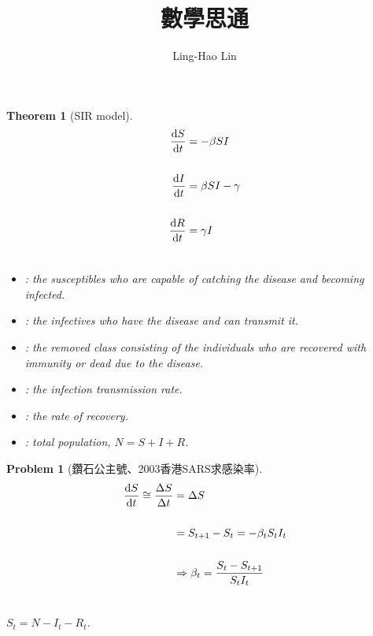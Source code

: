 \documentclass[12pt,a4paper]{article}
\title{數學思通}
\author{Ling-Hao Lin}
\date{}
\newtheorem*{theorem}{Theorem}
\newtheorem*{problem}{Problem}
\begin{document}
\maketitle

\begin{theorem}[SIR model]

\begin{align*}
\odv{S}{t}&= -\beta SI \\
\quad\\
\odv{I}{t}&= \beta SI-\gamma\\
\quad\\
\odv{R}{t}&= \gamma I\\
\quad
\end{align*}

\begin{itemize}
\item[S]: the susceptibles who are capable of catching the disease and becoming infected.
\item[I]: the infectives who have the disease and can transmit it.
\item[R]: the removed class consisting of the individuals who are recovered with immunity or dead due to the disease.
\item[$\beta$]: the infection transmission rate.
\item[$\gamma$]: the rate of recovery.
\item[N]: total population, $N=S+I+R$.
\end{itemize}

\end{theorem}
\quad
\begin{problem}[鑽石公主號、2003香港SARS求感染率]

\begin{align*}
\odv{S}{t}\cong \frac{\Delta S}{\Delta t}&=\Delta S\\
\quad\\
                                         &=S_{t+1}-S_{t}=-\beta_{t}S_{t}I_{t}\\
                                         \quad\\
                                         &\Rightarrow \beta_{t}=\frac{S_{t}-S_{t+1}}{S_{t}I_{t}}\\
                                         \quad
\end{align*}

$S_{t}=N-I_{t}-R_{t}$.

\end{problem}
\end{document}
